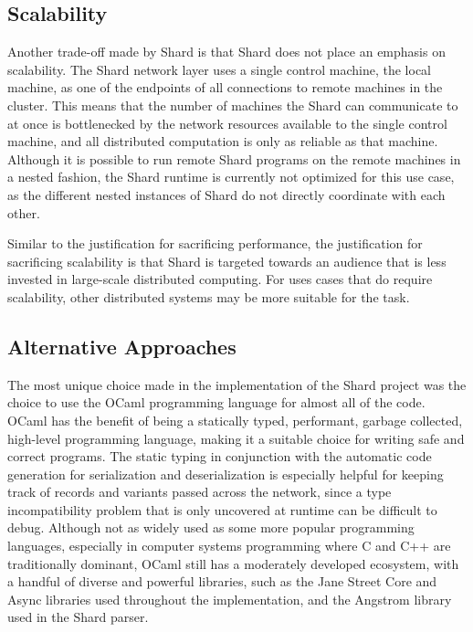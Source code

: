 \documentclass[oneside]{report}
\begin{document}
\subsection{Scalability}
Another trade-off made by Shard is that Shard does not place an emphasis on scalability.
The Shard network layer uses a single control machine, the local machine, as one of the endpoints of all connections to remote machines in the cluster.
This means that the number of machines the Shard can communicate to at once is bottlenecked by the network resources available to the single control machine, and all distributed computation is only as reliable as that machine.
Although it is possible to run remote Shard programs on the remote machines in a nested fashion, the Shard runtime is currently not optimized for this use case, as the different nested instances of Shard do not directly coordinate with each other.

Similar to the justification for sacrificing performance, the justification for sacrificing scalability is that Shard is targeted towards an audience that is less invested in large-scale distributed computing.
For uses cases that do require scalability, other distributed systems may be more suitable for the task.

\subsection{Alternative Approaches}

The most unique choice made in the implementation of the Shard project was the choice to use the OCaml programming language for almost all of the code.
OCaml has the benefit of being a statically typed, performant, garbage collected, high-level programming language, making it a suitable choice for writing safe and correct programs.
The static typing in conjunction with the automatic code generation for serialization and deserialization is especially helpful for keeping track of records and variants passed across the network, since a type incompatibility problem that is only uncovered at runtime can be difficult to debug.
Although not as widely used as some more popular programming languages, especially in computer systems programming where C and C++ are traditionally dominant, OCaml still has a moderately developed ecosystem, with a handful of diverse and powerful libraries, such as the Jane Street Core and Async libraries used throughout the implementation, and the Angstrom library used in the Shard parser.
\end{document}
